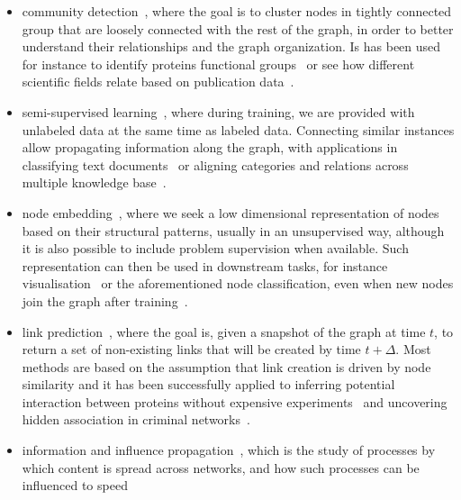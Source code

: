 \begin{itemize}[nosep,leftmargin=*]
  \item community detection~\autocite{FortunatoSurvey10}, where the goal is to cluster nodes in
    tightly connected group that are loosely connected with the rest of the graph, in order to
    better understand their relationships and the graph organization. Is has been used for instance
    to identify proteins functional groups~\autocite{clusterBio03} or see how different scientific
    fields relate based on publication data~\autocite{clusterScience08}.
  \item semi-supervised learning~\autocites{SSL06}{graphSSL14}, where during training, we are
    provided with unlabeled data at the same time as labeled data. Connecting similar instances
    allow propagating information along the graph, with applications in classifying text
    documents~\autocite{sslText09} or aligning categories and relations across multiple knowledge
    base~\autocite{sslKB13}.
  \item node embedding~\autocite{representationLearning17}, where we seek a low dimensional
    representation of nodes based on their structural patterns, usually in an unsupervised way,
    although it is also possible to include problem supervision when available. Such representation can
    then be used in downstream tasks, for instance visualisation~\autocite{LINE15} or the
    aforementioned node classification, even when new nodes join the graph after
    training~\autocite{inductiveRepresentation17}.
  \item link prediction~\autocite{linkPredSurvey16}, where the goal is, given a snapshot of the
    graph at time $t$, to return a set of non-existing links that will be created by time
    $t+\Delta$. Most methods are based on the assumption that link creation is driven by node
    similarity and it has been successfully applied to inferring potential interaction between
    proteins without expensive experiments~\autocite{linkPredBio06} and uncovering hidden
    association in criminal networks~\autocite{linkPredCrime08}.
  \item information and influence propagation~\autocite{infmax13}, which is the study of processes
    by which content is spread across networks, and how such processes can be influenced to speed

\end{itemize}
